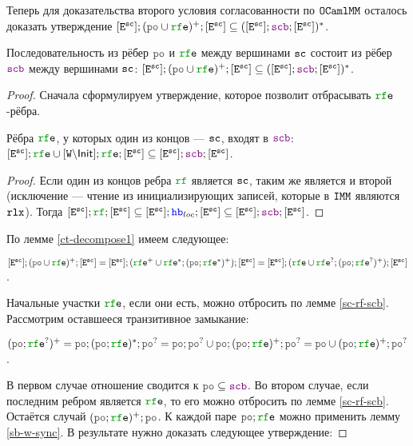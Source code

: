 Теперь для доказательства второго условия согласованности по $\mathtt{OCaml}\allowbreak \mathtt{MM}$ осталось доказать утверждение $[\lE^{\sco}];(\lPO \cup \lRFE)^{+} ; [\lE^{\sco}] \subseteq ([\lE^\sco] ; \lSCB ; [\lE^\sco])^{*}$. 

\begin{theorem} \label{sc-po-rfe-pscb}
  Последовательность из рёбер $\lPO$ и $\lRFE$ между вершинами ${\mathtt{sc}}$ состоит из рёбер $\lSCB$ между вершинами ${\mathtt{sc}}$: $[\lE^{\sco}];(\lPO \cup \lRFE)^{+} ; [\lE^{\sco}] \subseteq ([\lE^\sco] ; \lSCB ; [\lE^\sco])^{*}$.
\end{theorem}
\begin{proof}

  Сначала сформулируем утверждение, которое позволит отбрасывать $\lRFE$-рёбра. 

  \begin{lemma} \label{sc-rf-scb}
    Рёбра $\lRFE$, у которых один из концов --- ${\mathtt{sc}}$, входят в $\lSCB$: $[\lE^{\sco}];\lRFE \cup [\lW\backslash \Init];\lRFE;[\lE^{\sco}] \subseteq [\lE^\sco] ; \lSCB ; [\lE^\sco]$. 
  \end{lemma}
  \begin{proof}    
    Если один из концов ребра $\lRF$ является ${\mathtt{sc}}$, таким же является и второй (исключение --- чтение из инициализирующих записей, которые в $\mathtt{IMM}$ являются $\mathtt{rlx}$).
    Тогда $[\lE^{\sco}];\lRF;[\lE^{\sco}] \subseteq [\lE^{\sco}];\lHB_{loc};[\lE^{\sco}] \subseteq [\lE^{\sco}];\lSCB;[\lE^{\sco}]$.
  \end{proof}
  
  По лемме \ref{ct-decompose1} имеем следующее:

  $[\lE^{\sco}];(\lPO \cup \lRFE)^{+};[\lE^{\sco}] = [\lE^{\sco}];(\lRFE^{+} \cup \lRFE^{*} ; (\lPO ; \lRFE^{*})^{+});[\lE^{\sco}]=[\lE^{\sco}];(\lRFE \cup \lRFE^{?} ; (\lPO ; \lRFE^{?})^{+}); [\lE^{\sco}]$.

  Начальные участки $\lRFE$, если они есть, можно отбросить по лемме \ref{sc-rf-scb}. Рассмотрим оставшееся транзитивное замыкание:

  $(\lPO ; \lRFE^{?})^{+} = \lPO; (\lPO ; \lRFE)^{*} ; \lPO^? = \lPO; \lPO^{?} \cup \lPO; (\lPO ; \lRFE)^{+};\lPO^? = \lPO \cup (\lPO ; \lRFE)^{+};\lPO^?$. 

  В первом случае отношение сводится к  $\lPO \subseteq \lSCB$. Во втором случае, если последним ребром является $\lRFE$, то его можно отбросить по лемме \ref{sc-rf-scb}. Остаётся случай $(\lPO ; \lRFE)^{+} ; \lPO$. К каждой паре $\lPO ; \lRFE$ можно применить лемму \ref{sb-w-sync}. В результате нужно доказать следующее утверждение:


\end{proof}
